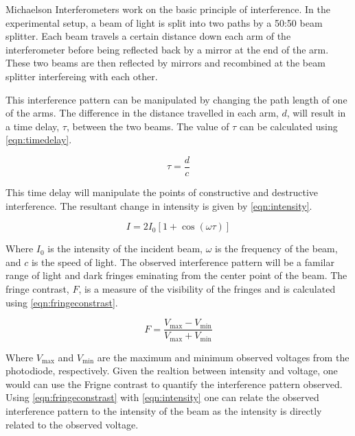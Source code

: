 \documentclass[aip, cp, amsmath, amssymb, reprint]{revtex4-2}
\begin{document}
        Michaelson Interferometers work on the basic principle of interference. In the experimental setup, a beam of light is split into two paths by a 50:50 beam splitter. Each beam travels a certain distance down each arm of the interferometer before being reflected back by a mirror at the end of the arm. These two beams are then reflected by mirrors and recombined at the beam splitter interfereing with each other. 

        This interference pattern can be manipulated by changing the path length of one of the arms. The difference in the distance travelled in each arm, $d$, will result in a time delay, $\tau$, between the two beams. The value of $\tau$ can be calculated using \eqref{eqn:timedelay}.
        
        \begin{equation} \label{eqn:timedelay}
            \tau = \dfrac{d}{c}
        \end{equation}
        
        This time delay will manipulate the points of constructive and destructive interference. The resultant change in intensity is given by \eqref{eqn:intensity}.
       
        \begin{equation} \label{eqn:intensity}
            I = 2 I_0 \left[1 +  \cos(\omega \tau)\right]
        \end{equation}

        Where $I_0$ is the intensity of the incident beam, $\omega$ is the frequency of the beam, and $c$ is the speed of light. The observed interference pattern will be a familar range of light and dark fringes eminating from the center point of the beam. The fringe contrast, $F$, is a measure of the visibility of the fringes and is calculated using \eqref{eqn:fringeconstrast}.
    
        \begin{equation} \label{eqn:fringeconstrast}
            F = \dfrac{V_{\text{max}} - V_{\text{min}}}{V_{\text{max}} + V_{\text{min}}}
        \end{equation}

        Where $V_{\text{max}}$ and $V_{\text{min}}$ are the maximum and minimum observed voltages from the photodiode, respectively. Given the realtion between intensity and voltage, one would can use the Frigne contrast to quantify the interference pattern observed. Using \eqref{eqn:fringeconstrast} with \eqref{eqn:intensity} one can relate the observed interference pattern to the intensity of the beam as the intensity is directly related to the observed voltage.
\end{document}
